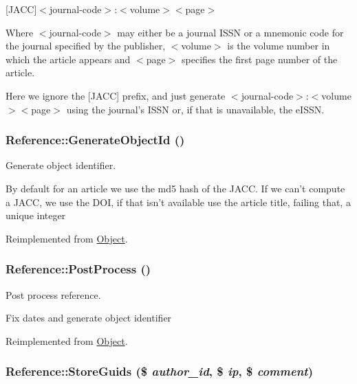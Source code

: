\mbox{[}JACC\mbox{]}$<$journal-code$>$:$<$volume$>$$<$page$>$

Where $<$journal-code$>$ may either be a journal ISSN or a mnemonic code for the journal specified by the publisher, $<$volume$>$ is the volume number in which the article appears and $<$page$>$ specifies the first page number of the article.

Here we ignore the \mbox{[}JACC\mbox{]} prefix, and just generate $<$journal-code$>$:$<$volume$>$$<$page$>$ using the journal's ISSN or, if that is unavailable, the eISSN. \hypertarget{class_reference_654f7079c3dca7b71d4571a0dd5891f2}{
\subsubsection{\setlength{\rightskip}{0pt plus 5cm}Reference::GenerateObjectId ()}}
\label{class_reference_654f7079c3dca7b71d4571a0dd5891f2}


Generate object identifier. 

By default for an article we use the md5 hash of the JACC. If we can't compute a JACC, we use the DOI, if that isn't available use the article title, failing that, a unique integer 

Reimplemented from \hyperlink{class_object_291597e1743bd57c40b8b49ae676e940}{Object}.\hypertarget{class_reference_c7779622864167fadc772a7a52d38c55}{
\subsubsection{\setlength{\rightskip}{0pt plus 5cm}Reference::PostProcess ()}}
\label{class_reference_c7779622864167fadc772a7a52d38c55}


Post process reference. 

Fix dates and generate object identifier 

Reimplemented from \hyperlink{class_object_4ca6ebed0ef8d6b792fec824e3fbe0bc}{Object}.\hypertarget{class_reference_eb3baaf7d34623479bbeaeccf8bbd070}{
\subsubsection{\setlength{\rightskip}{0pt plus 5cm}Reference::StoreGuids (\$ {\em author\_\-id}, \/  \$ {\em ip}, \/  \$ {\em comment})}}
\label{class_reference_eb3baaf7d34623479bbeaeccf8bbd070}


